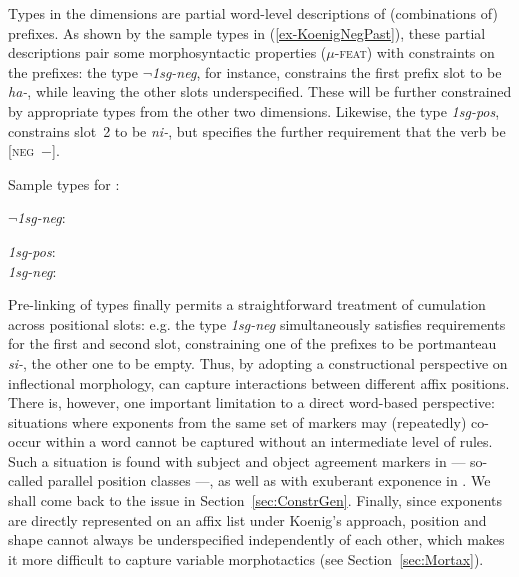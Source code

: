 \documentclass[output=paper
	        ,collection
	        ,collectionchapter
 	        ,biblatex
                ,babelshorthands
                ,newtxmath
                ,draftmode
                ,colorlinks, citecolor=brown
]{langscibook}
\begin{document}
Types in the dimensions are partial word-level descriptions of
(combinations of) prefixes. As shown by the sample types in (\ref{ex-KoenigNegPast}), these partial descriptions pair some
morphosyntactic properties (\textsc{$\mu$-feat}) with constraints on
the prefixes: the type \textit{$\neg$1sg-neg}, for instance, constrains the
first prefix slot to be \textit{ha-}, while leaving the other slots
underspecified. These will be further constrained by appropriate types
from the other two dimensions. Likewise, the type \textit{1sg-pos},
constrains slot~2 to be \textit{ni-}, but specifies the further
requirement that the verb be \textsc{[neg~$-$]}.    

\begin{exe}
\ex\label{ex-KoenigNegPast}
Sample types for :
\begin{xlist}
\ex \textit{$\neg$1sg-neg}:\\

\ex \textit{1sg-pos}:\\
\ex \textit{1sg-neg}:\\
\zl


Pre-linking of types finally permits a straightforward treatment of
cumulation across positional slots: e.g. the type \textit{1sg-neg}
simultaneously satisfies requirements for the first and second slot,
constraining one of the prefixes to be portmanteau \textit{si-}, the
other one to be empty. Thus, by adopting a constructional perspective
on inflectional morphology, \citet{Koenig99} can capture interactions
between different affix positions. There is, however, one important
limitation to a direct word-based perspective: situations where
exponents from the same set of markers may (repeatedly) co-occur
within a word cannot be captured without an intermediate level of
rules. Such a situation is found with subject and object agreement
markers in  --- so-called parallel position classes
\citep{Stump93,Crysmann:Bonami:2016} ---, as well as with exuberant
exponence in  \citep{Harris09,Crysmann:2018:Batsbi}. We shall
come back to the issue in Section~\ref{sec:ConstrGen}. Finally, since
exponents are directly represented on an affix list under Koenig's
approach, position and shape cannot always be underspecified
independently of each other, which makes it more difficult to
capture variable morphotactics (see Section~\ref{sec:Mortax}).



\end{xlist}
\end{exe}
\end{document}
